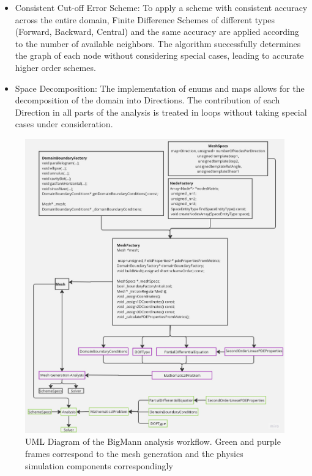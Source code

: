 \documentclass{article}
\begin{document}
\begin{itemize}
		\item Consistent Cut-off Error Scheme: To apply a scheme with consistent accuracy across the entire domain, Finite Difference Schemes of different types (Forward, Backward, Central) and the same accuracy are applied according to the number of available neighbors. The algorithm successfully determines the graph of each node without considering special cases, leading to accurate higher order schemes.
		
		\item Space Decomposition: The implementation of enums and maps allows for the decomposition of the domain into Directions. The contribution of each Direction in all parts of the analysis is treated in loops without taking special cases under consideration.
	\end{itemize}

	\begin{figure}[H]

		\includegraphics[height=1.0\textheight, width=1.05\textwidth, keepaspectratio]{./images/uml.jpg}
		\caption{UML Diagram of the BigMann analysis workflow. Green and purple frames correspond to the mesh generation and the physics simulation components correspondingly}
		\label{fig:UML}
	\end{figure}
	
\end{document}
